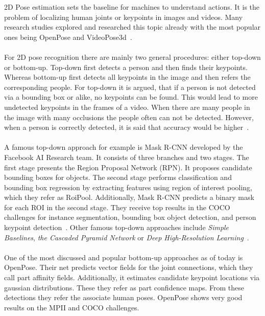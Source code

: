     2D Pose estimation sets the baseline for machines to understand actions.
    It is the problem of localizing human joints or keypoints in images and videos.
    Many research studies explored and researched this topic already with the most popular ones being OpenPose
    and VideoPose3d~\cite{openpose, videopose3d}.
\\\mbox{}\\
    For 2D pose recognition there are mainly two general procedures: either top-down or bottom-up.
    Top-down first detects a person and then finds their keypoints.
    Whereas bottom-up first detects all keypoints in the image and then refers the corresponding people.
    For top-down it is argued, that if a person is not detected via a bounding box or alike, no keypoints can be
    found.
    This would lead to more undetected keypoints in the frames of a video.
    When there are many people in the image with many occlusions the people often can not be detected.
    However, when a person is correctly detected, it is said that accuracy would be higher~\cite{synergetic}.
\\\mbox{}\\
    A famous top-down approach for example is Mask R-CNN developed by the Facebook AI Research team. It consists
    of three branches and two stages.
    The first stage presents the Region Proposal Network (RPN). It proposes candidate bounding boxes for objects.
    The second stage performs classification and bounding box regression by extracting features using region of
    interest pooling, which they refer as RoiPool.
    Additionally, Mask R-CNN predicts a binary mask for each ROI in the second stage.
    They receive top results in the COCO challenges for instance segmentation, bounding box object detection, and
    person keypoint detection~\cite{maskrcnn}.
    Other famous top-down approaches include \textit{Simple Baselines}, \textit{the Cascaded Pyramid Network} or
    \textit{Deep High-Resolution Learning}~\cite{simplebaselines,pyramidnetwork, highres}.
\\\mbox{}\\
    One of the most discussed and popular bottom-up approaches as of today is OpenPose.
    Their net predicts vector fields for the joint connections, which they call part affinity fields.
    Additionally, it estimates candidate keypoint locations via gaussian distributions.
    These they refer as part confidence maps.
    From these detections they refer the associate human poses.
    OpenPose shows very good results on the MPII and COCO challenges.
